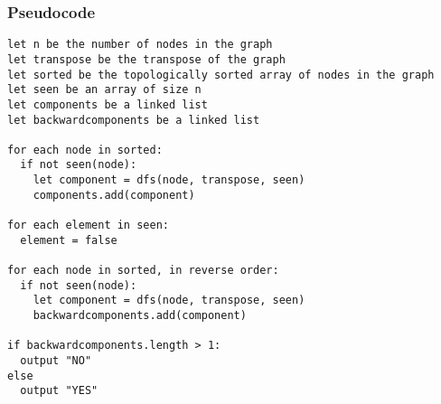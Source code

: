 \documentclass{math}
\begin{document}
\subsubsection*{Pseudocode}
\begin{lstlisting}
let n be the number of nodes in the graph
let transpose be the transpose of the graph
let sorted be the topologically sorted array of nodes in the graph
let seen be an array of size n
let components be a linked list
let backwardcomponents be a linked list

for each node in sorted:
  if not seen(node):
    let component = dfs(node, transpose, seen)
    components.add(component)

for each element in seen:
  element = false

for each node in sorted, in reverse order:
  if not seen(node):
    let component = dfs(node, transpose, seen)
    backwardcomponents.add(component)

if backwardcomponents.length > 1:
  output "NO"
else
  output "YES"
\end{lstlisting}
\end{document}
